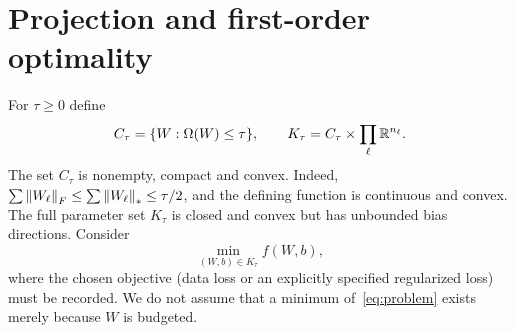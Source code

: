 \section{Projection and first-order optimality}\label{sec:projection}
For $\tau\ge0$ define
\begin{equation}\label{eq:constraint}
 C_\tau=\{W:\Omega(W)\le\tau\},\qquad K_\tau=C_\tau\times\prod_\ell\mathbb R^{n_\ell}.
\end{equation}
The set $C_\tau$ is nonempty, compact and convex. Indeed, $\sum\left\lVert W_\ell\right\rVert_F\le\sum\left\lVert W_\ell\right\rVert_*\le\tau/2$, and the defining function is continuous and convex. The full parameter set $K_\tau$ is closed and convex but has unbounded bias directions. Consider
\begin{equation}\label{eq:problem}
 \min_{(W,b)\in K_\tau} f(W,b),
\end{equation}
where the chosen objective (data loss or an explicitly specified regularized loss) must be recorded. We do not assume that a minimum of~\eqref{eq:problem} exists merely because $W$ is budgeted.

